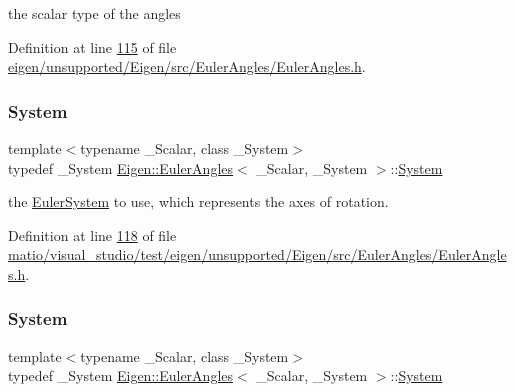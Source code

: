 the scalar type of the angles 

Definition at line \hyperlink{eigen_2unsupported_2_eigen_2src_2_euler_angles_2_euler_angles_8h_source_l00115}{115} of file \hyperlink{eigen_2unsupported_2_eigen_2src_2_euler_angles_2_euler_angles_8h_source}{eigen/unsupported/\+Eigen/src/\+Euler\+Angles/\+Euler\+Angles.\+h}.

\mbox{\label{class_eigen_1_1_euler_angles_a17e3dee5fef4af35bbb4e319c2cdc3c1}} 
\subsubsection{\texorpdfstring{System}{System}\hspace{0.1cm}{\footnotesize\ttfamily [1/2]}}
{\footnotesize\ttfamily template$<$typename \+\_\+\+Scalar, class \+\_\+\+System$>$ \\
typedef \+\_\+\+System \hyperlink{class_eigen_1_1_euler_angles}{Eigen\+::\+Euler\+Angles}$<$ \+\_\+\+Scalar, \+\_\+\+System $>$\+::\hyperlink{class_eigen_1_1_euler_angles_a17e3dee5fef4af35bbb4e319c2cdc3c1}{System}}

the \hyperlink{class_eigen_1_1_euler_system}{Euler\+System} to use, which represents the axes of rotation. 

Definition at line \hyperlink{matio_2visual__studio_2test_2eigen_2unsupported_2_eigen_2src_2_euler_angles_2_euler_angles_8h_source_l00118}{118} of file \hyperlink{matio_2visual__studio_2test_2eigen_2unsupported_2_eigen_2src_2_euler_angles_2_euler_angles_8h_source}{matio/visual\+\_\+studio/test/eigen/unsupported/\+Eigen/src/\+Euler\+Angles/\+Euler\+Angles.\+h}.

\mbox{\label{class_eigen_1_1_euler_angles_a17e3dee5fef4af35bbb4e319c2cdc3c1}} 
\subsubsection{\texorpdfstring{System}{System}\hspace{0.1cm}{\footnotesize\ttfamily [2/2]}}
{\footnotesize\ttfamily template$<$typename \+\_\+\+Scalar, class \+\_\+\+System$>$ \\
typedef \+\_\+\+System \hyperlink{class_eigen_1_1_euler_angles}{Eigen\+::\+Euler\+Angles}$<$ \+\_\+\+Scalar, \+\_\+\+System $>$\+::\hyperlink{class_eigen_1_1_euler_angles_a17e3dee5fef4af35bbb4e319c2cdc3c1}{System}}

